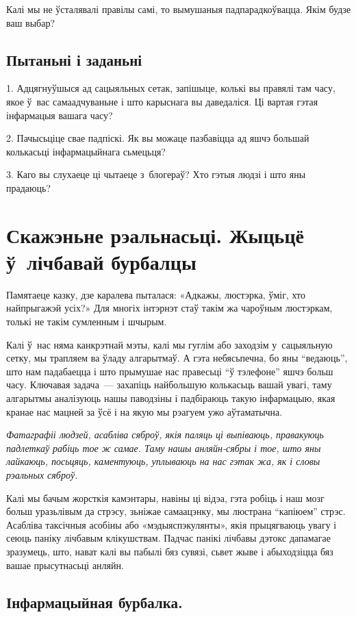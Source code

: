 Калі мы не ўсталявалі правілы самі, то вымушаныя падпарадкоўвацца. Якім будзе ваш выбар?

\subsection*{Пытаньні і заданьні}

1. Адцягнуўшыся ад сацыяльных сетак, запішыце, колькі вы правялі там часу, якое ў~вас самаадчуваньне і што карыснага вы даведаліся. Ці вартая гэтая інфармацыя вашага часу?

2. Пачысьціце свае падпіскі. Як вы можаце пазбавіцца ад яшчэ большай колькасьці інфармацыйнага сьмецьця?

3. Каго вы слухаеце ці чытаеце з~блогераў? Хто гэтыя людзі і што яны прадаюць?


\section{Скажэньне рэальнасьці. Жыцьцё ў~лічбавай бурбалцы}

Памятаеце казку, дзе каралева пыталася: «Адкажы, люстэрка, ўміг, хто найпрыгажэй усіх?» Для многіх інтэрнэт стаў такім жа чароўным люстэркам, толькі не такім сумленным і шчырым.

Калі ў~нас няма канкрэтнай мэты, калі мы гуглім або заходзім у~сацыяльную сетку, мы трапляем ва ўладу алгарытмаў. А гэта небясьпечна, бо яны ``ведаюць'', што нам падабаецца і што прымушае нас правесьці ``ў тэлефоне'' яшчэ больш часу. Ключавая задача~--- захапіць найбольшую колькасьць вашай увагі, таму алгарытмы аналізуюць нашы паводзіны і падбіраюць такую інфармацыю, якая кранае нас мацней за ўсё і на якую мы рэагуем ужо аўтаматычна.

\emph{Фатаграфіі людзей, асабліва сяброў, якія паляць ці выпіваюць, правакуюць падлеткаў рабіць тое ж самае. Таму нашы анляйн-сябры і тое, што яны лайкаюць, посьцяць, каментуюць, уплываюць на нас гэтак жа, як і словы рэальных сяброў.}

Калі мы бачым жорсткія камэнтары, навіны ці відэа, гэта робіць і наш мозг больш уразьлівым да стрэсу, зьніжае самаацэнку, мы люстрана ``капіюем'' стрэс. Асабліва таксічныя асобіны або «мэдыяспэкулянты», якія прыцягваюць увагу і сеюць паніку лічбавым клікушствам. Падчас панікі лічбавы дэтокс дапамагае зразумець, што, нават калі вы пабылі бяз сувязі, сьвет жыве і абыходзіцца бяз вашае прысутнасьці анляйн.

\subsection*{Інфармацыйная бурбалка.}

